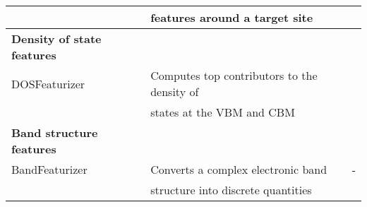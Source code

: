 \begin{center}
\begin{longtable}{M{3.5cm} M{6.5cm} M{2.0cm}}
   & features around a target site & \\ 
\hline     
  \textbf{Density of state features} & & \\
  DOSFeaturizer & Computes top contributors to the density of  & \cite{Dylla2020} \\ 
  & states at the VBM and CBM  & \\ 
  \hline  
  \textbf{Band structure features} & & \\
  BandFeaturizer & Converts a complex electronic band  & - \\ 
   &structure into discrete quantities  & \\ 
\hline 
\end{longtable}
\end{center}
